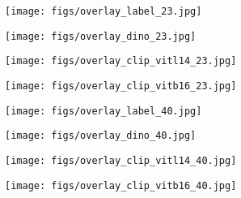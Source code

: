 \documentclass[10pt,twocolumn,letterpaper]{article}
\begin{document}
\begin{figure}[!t]
\centering
    \begin{subfigure}{0.21\linewidth}
        \centering
        \texttt{[image: figs/overlay\_label\_23.jpg]}
        \vspace{-5mm}
    \end{subfigure}
    \begin{subfigure}{0.21\linewidth}
        \centering
        \texttt{[image: figs/overlay\_dino\_23.jpg]}
        \vspace{-5mm}
    \end{subfigure}
    \begin{subfigure}{0.21\linewidth}
        \centering
        \texttt{[image: figs/overlay\_clip\_vitl14\_23.jpg]}
        \vspace{-5mm}
    \end{subfigure}
    \begin{subfigure}{0.21\linewidth}
        \centering
        \texttt{[image: figs/overlay\_clip\_vitb16\_23.jpg]}
        \vspace{-5mm}
    \end{subfigure}

    \begin{subfigure}{0.21\linewidth}
        \centering
        \texttt{[image: figs/overlay\_label\_40.jpg]}
        \vspace{-5mm}
    \end{subfigure}
    \begin{subfigure}{0.21\linewidth}
        \centering
        \texttt{[image: figs/overlay\_dino\_40.jpg]}
        \vspace{-5mm}
    \end{subfigure}
    \begin{subfigure}{0.21\linewidth}
        \centering
        \texttt{[image: figs/overlay\_clip\_vitl14\_40.jpg]}
        \vspace{-5mm}
    \end{subfigure}
    \begin{subfigure}{0.21\linewidth}
        \centering
        \texttt{[image: figs/overlay\_clip\_vitb16\_40.jpg]}
        \vspace{-5mm}
    \end{subfigure}


\end{figure}
\end{document}
